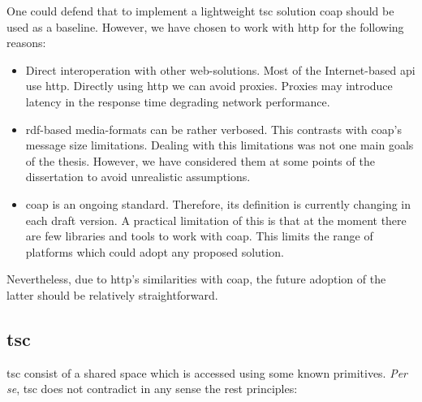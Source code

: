 One could defend that to implement a lightweight \ac{tsc} solution \ac{coap} should be used as a baseline.
However, we have chosen to work with \ac{http} for the following reasons:
\begin{itemize}
  \item Direct interoperation with other web-solutions.
        Most of the Internet-based \ac{api} use \ac{http}.
        Directly using \ac{http} we can avoid proxies.
        Proxies may introduce latency in the response time degrading network performance. %
  \item \ac{rdf}-based media-formats can be rather verbosed.
	This contrasts with \ac{coap}'s message size limitations.
	Dealing with this limitations was not one main goals of the thesis.
	However, we have considered them at some points of the dissertation to avoid unrealistic assumptions.
  \item \ac{coap} is an ongoing standard.
        Therefore, its definition is currently changing in each draft version.
        A practical limitation of this is that at the moment there are few libraries and tools to work with \ac{coap}.
        This limits the range of platforms which could adopt any proposed solution.
\end{itemize}


Nevertheless, due to \ac{http}'s similarities with \ac{coap}, the future adoption of the latter should be relatively straightforward.




\subsection{\acl{tsc}}
\label{sec:tsc_vs_rest}

\ac{tsc} consist of a shared space which is accessed using some known primitives.
\emph{Per se}, \ac{tsc} does not contradict in any sense the \ac{rest} principles:


